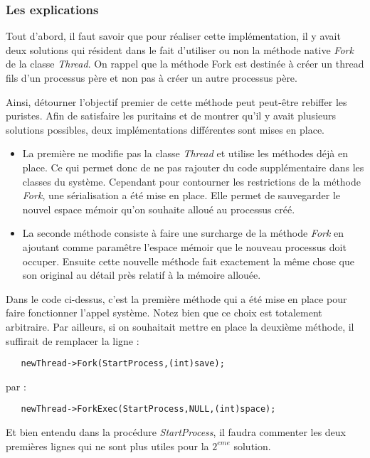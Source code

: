 \documentclass[a4paper,10pt]{report}
\begin{document}
    \newpage
  \textcolor{TealBlue}{\subsubsection*{Les explications}}
    Tout d'abord, il faut savoir que pour réaliser cette implémentation, il y avait deux solutions qui résident dans le fait d'utiliser ou non la méthode
    native \emph{Fork} de la classe \emph{Thread}. On rappel que la méthode Fork est destinée à créer un thread fils d'un processus père et non pas à 
    créer un autre processus père. 
    
    Ainsi, détourner l'objectif premier de cette méthode peut peut-être rebiffer les puristes. Afin de satisfaire les puritains et de montrer qu'il y avait plusieurs
    solutions possibles, deux implémentations différentes sont mises en place. 
    
    \begin{itemize}
     \item La première ne modifie pas la classe \emph{Thread} et utilise les méthodes
    déjà en place. Ce qui permet donc de ne pas rajouter du code supplémentaire dans les classes du système. Cependant pour contourner les restrictions
    de la méthode \emph{Fork}, une sérialisation a été mise en place. Elle permet de sauvegarder le nouvel espace mémoir qu'on souhaite alloué au 
    processus créé.
    
    \item La seconde méthode consiste à faire une surcharge de la méthode \emph{Fork} en ajoutant comme paramêtre l'espace mémoir que le nouveau processus
    doit occuper. Ensuite cette nouvelle méthode fait exactement la même chose que son original au détail près relatif à la mémoire allouée.
    \end{itemize}
  Dans le code ci-dessus, c'est la première méthode qui a été mise en place pour faire fonctionner l'appel système. Notez bien que ce choix est totalement 
  arbitraire. 
  Par ailleurs, si on souhaitait mettre en place la deuxième méthode, il suffirait de remplacer la ligne : 
  \begin{lstlisting}
   newThread->Fork(StartProcess,(int)save);
  \end{lstlisting}
  par : 
  \begin{lstlisting}
   newThread->ForkExec(StartProcess,NULL,(int)space);
  \end{lstlisting}
  Et bien entendu dans la procédure \emph{StartProcess}, il faudra commenter les deux premières lignes qui ne sont plus utiles pour la $2^{eme}$ solution.
  
\end{document}
